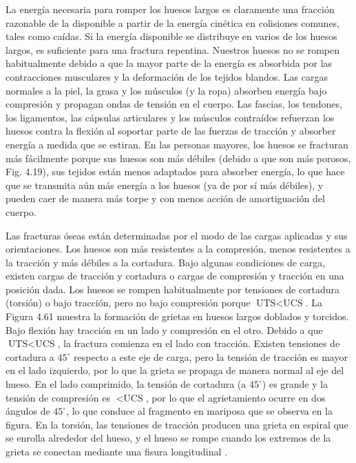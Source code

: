 \documentclass[12pt]{book}
\begin{document}
La energía necesaria para romper los huesos largos es claramente una fracción razonable de la disponible a partir de la energía cinética en colisiones comunes, tales como caídas. Si la energía disponible se distribuye en varios de los huesos largos, es suficiente para una fractura repentina. Nuestros huesos no se rompen habitualmente debido a que la mayor parte de la energía es absorbida por las contracciones musculares y la deformación de los tejidos blandos. Las cargas normales a la piel, la grasa y los músculos (y la ropa) absorben energía bajo compresión y propagan ondas de tensión en el cuerpo. Las fascias, los tendones, los ligamentos, las cápsulas articulares y los músculos contraídos refuerzan los huesos contra la flexión al soportar parte de las fuerzas de tracción y absorber energía a medida que se estiran. En las personas mayores, los huesos se fracturan más fácilmente porque sus huesos son más débiles (debido a que son más porosos, Fig. 4.19), sus tejidos están menos adaptados para absorber energía, lo que hace que se transmita aún más energía a los huesos (ya de por sí más débiles), y pueden caer de manera más torpe y con menos acción de amortiguación del cuerpo.

Las fracturas óseas están determinadas por el modo de las cargas aplicadas y sus orientaciones. Los huesos son más resistentes a la compresión, menos resistentes a la tracción y más débiles a la cortadura. Bajo algunas condiciones de carga, existen cargas de tracción y cortadura o cargas de compresión y tracción en una posición dada. Los huesos se rompen habitualmente por tensiones de cortadura (torsión) o bajo tracción, pero no bajo compresión porque $\text{UTS} < \text{UCS}$. La Figura 4.61 muestra la formación de grietas en huesos largos doblados y torcidos. Bajo flexión hay tracción en un lado y compresión en el otro. Debido a que $\text{UTS} < \text{UCS}$, la fractura comienza en el lado con tracción. Existen tensiones de cortadura a $45^\circ$ respecto a este eje de carga, pero la tensión de tracción es mayor en el lado izquierdo, por lo que la grieta se propaga de manera normal al eje del hueso. En el lado comprimido, la tensión de cortadura (a $45^\circ$) es grande y la tensión de compresión es $<\text{UCS}$, por lo que el agrietamiento ocurre en dos ángulos de $45^\circ$, lo que conduce al fragmento en mariposa que se observa en la figura. En la torsión, las tensiones de tracción producen una grieta en espiral que se enrolla alrededor del hueso, y el hueso se rompe cuando los extremos de la grieta se conectan mediante una fisura longitudinal \cite{45}.
\end{document}
